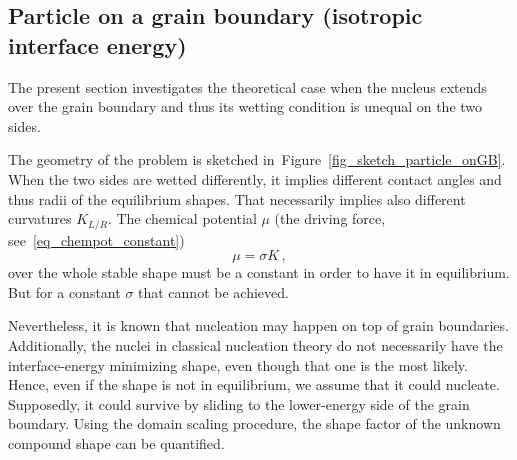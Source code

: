 \subsection{Particle on a grain boundary (isotropic interface energy)}
The present section investigates the theoretical case when the nucleus extends over the grain boundary and thus its wetting condition is unequal on the two sides. 

The geometry of the problem is sketched in~Figure~\ref{fig_sketch_particle_onGB}. When the two sides are wetted differently, it implies different contact angles and thus radii of the equilibrium shapes. That necessarily implies also different curvatures $K_{L/R}$. The chemical potential $\mu$ (the driving force, see~\eqref{eq_chempot_constant}) 
\begin{equation}
	\mu = \sigma K \,,
\end{equation}
over the whole stable shape must be a constant in order to have it in equilibrium. But for a constant $\sigma$ that cannot be achieved.

Nevertheless, it is known that nucleation may happen on top of grain boundaries. Additionally, the nuclei in classical nucleation theory do not necessarily have the interface-energy minimizing shape, even though that one is the most likely. Hence, even if the shape is not in equilibrium, we assume that it could nucleate. Supposedly, it could survive by sliding to the lower-energy side of the grain boundary. Using the domain scaling procedure, the shape factor of the unknown compound shape can be quantified.

